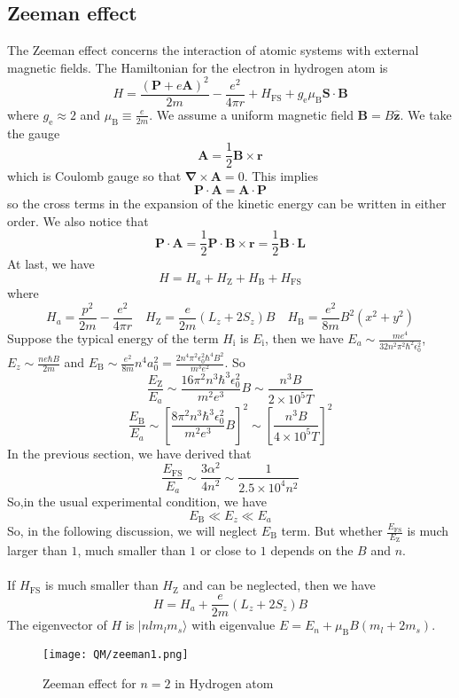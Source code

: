 \subsection{Zeeman effect}
The Zeeman effect concerns the interaction of atomic systems with external magnetic fields. The Hamiltonian for the electron in hydrogen atom is
\[H = \frac{(\bm{P}+e\bm{A})^2}{2m} - \frac{e^2}{4\pi r} + H_{\mathrm{FS}} + g_{\mathrm{e}} \mu_{\mathrm{B}}\bm{S}\cdot\bm{B}\]
where $g_{\mathrm{e}} \approx 2$ and $\mu_{\mathrm{B}} \equiv \frac{e}{2m}$.
We assume a uniform magnetic field $\bm{B} = B\hat{\bm{z}}$. We take the gauge
\[\bm{A} = \frac{1}{2}\bm{B}\times\bm{r}\]
which is Coulomb gauge so that $\bm{\nabla}\times\bm{A} = 0$. This implies
\[\bm{P}\cdot\bm{A} = \bm{A}\cdot\bm{P}\]
so the cross terms in the expansion of the kinetic energy can be written in either order. We also notice that
\[\bm{P}\cdot\bm{A} = \frac{1}{2} \bm{P}\cdot\bm{B}\times\bm{r}  = \frac{1}{2}\bm{B}\cdot\bm{L}\] 
At last, we have
\[H = H_a + H_{\mathrm{Z}} + H_{\mathrm{B}} + H_{\mathrm{FS}}\]
where
\[H_a = \frac{p^2}{2m} - \frac{e^2}{4\pi r} \quad  H_{\mathrm{Z}} = \frac{e}{2m}(L_z + 2S_z)B \quad H_{\mathrm{B}} = \frac{e^2}{8m}B^2(x^2+y^2)\]
Suppose the typical energy of the term $H_{\mathrm{i}}$ is $E_{\mathrm{i}}$, then we have $E_a \sim \frac{me^4}{32 n^2 \pi^2\hbar^2\epsilon_0^2}$, $E_z \sim \frac{ne\hbar B}{2m}$ and $E_{\mathrm{B}} \sim \frac{e^2}{8m}n^4 a_0^2 = \frac{2n^4\pi^2 \epsilon_0^2 \hbar^4 B^2}{m^3 e^2}$. So
\[\frac{E_{\mathrm{Z}}}{E_a} \sim \frac{16\pi^2 n^3 \hbar^3 \epsilon_0^2}{m^2 e^3} B \sim \frac{n^3B}{2\times10^5 T}\]
\[\frac{E_{\mathrm{B}}}{E_a} \sim \left[ \frac{8\pi^2 n^3 \hbar^3 \epsilon_0^2}{m^2 e^3} B\right]^2 \sim \left[ \frac{n^3B}{4\times10^5 T} \right]^2\]
In the previous section, we have derived that
\[\frac{E_{\mathrm{FS}}}{E_a} \sim \frac{3\alpha^2}{4n^2} \sim \frac{1}{2.5\times10^4 n^2}\]
So,in the usual experimental condition, we have
\[E_{\mathrm{B}} \ll E_z \ll E_a\]
So, in the following discussion, we will neglect $E_{\mathrm{B}}$ term.
But whether $\frac{E_{\mathrm{FS}}}{E_{\mathrm{Z}}}$ is much larger than $1$, much smaller than $1$ or close to $1$ depends on the $B$ and $n$.\\ \\
If $H_{\mathrm{FS}}$ is much smaller than $H_{\mathrm{Z}}$ and can be neglected, then we have
\[H = H_a + \frac{e}{2m}(L_z + 2S_z)B\]
The eigenvector of $H$ is $|nlm_lm_s\rangle$ with eigenvalue $E = E_n + \mu_{\mathrm{B}} B(m_l+2m_s)$.
\begin{figure}[!h]
	\centering
	\texttt{[image: QM/zeeman1.png]}
	\caption{Zeeman effect for $n=2$ in Hydrogen atom}
\end{figure}\\
